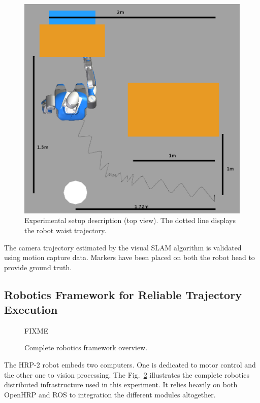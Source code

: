 \begin{figure}[ht!]
  \begin{center}
    \includegraphics[width=\linewidth]{images/dimensions.png}
  \end{center}
  \caption{Experimental setup description (top view). The dotted line
    displays the robot waist trajectory.\label{fig:xp_setup_dim}}
\end{figure}


The camera trajectory estimated by the visual SLAM algorithm is
validated using motion capture data. Markers have been placed on both
the robot head to provide ground truth.


\subsection{Robotics Framework for Reliable Trajectory Execution}\label{sec:ex_framework}

\begin{figure}[ht!]
  \begin{center}
    FIXME
  \end{center}
  \caption{Complete robotics framework
    overview. \label{fig:framework_overview}}
\end{figure}


The HRP-2 robot embeds two computers. One is dedicated to motor
control and the other one to vision processing. The
Fig.~\ref{fig:framework_overview} illustrates the complete robotics
distributed infrastructure used in this experiment. It relies heavily
on both OpenHRP and ROS to integration the different modules
altogether.



